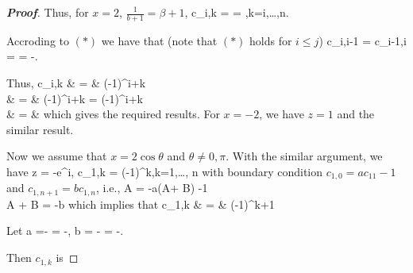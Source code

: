 \begin{proof}[\bf Proof]
Thus, for $x=2$, $\frac 1{b+1} = \beta + 1$,
\be
c_{i,k} =  =  ,\quad k=i,\dots,n.
\ee

Accroding to $(*)$ we have that (note that $(*)$ holds for $i\leq j$)
\be
c_{i,i-1} = c_{i-1,i} = = -.
\ee

Thus, 
\beast
c_{i,k} & = & (-1)^{i+k} \\
& = &  (-1)^{i+k} = (-1)^{i+k} \\
& = & 
\eeast
which gives the required results. For $x=-2$, we have $z=1$ and the similar result.

Now we assume that $x=2\cos\theta$ and $\theta \neq 0,\pi$. With the similar argument, we have 
\be
z = -e^{\pm i\theta}, \qquad c_{1,k} = (-1)^k,\qquad k=1,\dots, n
\ee
with boundary condition  $c_{1,0} = ac_{11}-1$ and $c_{1,n+1} = bc_{1,n}$, i.e.,
\be
{}
A = -a(A\cos\theta + B\sin\theta) -1 \\
A\cos{} + B\sin{} = -b
\ea
\ee
which implies that
\beast
c_{1,k} & = & (-1)^{k+1}
\eeast


Let 
\beast
a =- = -,\quad
b = - = -.
\eeast

Then $c_{1,k}$ is
\beast
{}
\eeast


\end{proof}
